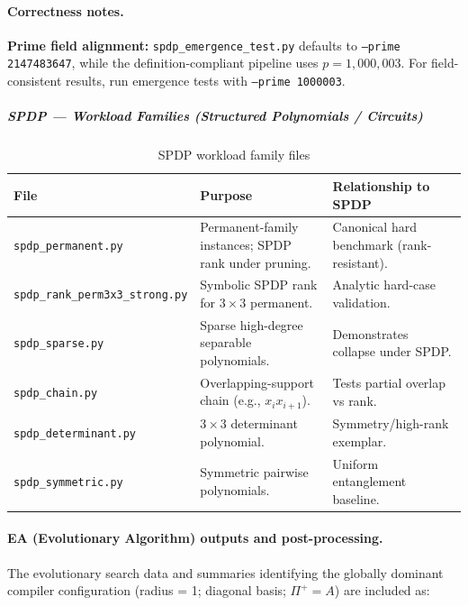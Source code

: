 \documentclass[12pt]{article}
\theoremstyle{definition}
\theoremstyle{definition}
\theoremstyle{remark}
\theoremstyle{remark}
\begin{document}
\paragraph{Correctness notes.}
\textbf{Prime field alignment:} \texttt{spdp\_emergence\_test.py} defaults to \texttt{--prime 2147483647}, while the definition-compliant pipeline uses $p = 1{,}000{,}003$. For field-consistent results, run emergence tests with \texttt{--prime 1000003}.

\subparagraph{SPDP --- Workload Families (Structured Polynomials / Circuits)}
\begin{table}[h]
\centering
\footnotesize
\begin{tabular}{p{3.8cm}p{5.2cm}p{5cm}}
\toprule
\textbf{File} & \textbf{Purpose} & \textbf{Relationship to SPDP} \\
\midrule
\texttt{spdp\_permanent.py} & Permanent-family instances; SPDP rank under pruning. & Canonical hard benchmark (rank-resistant). \\
\addlinespace
\texttt{spdp\_rank\_perm3x3\_\linebreak strong.py} & Symbolic SPDP rank for $3\times 3$ permanent. & Analytic hard-case validation. \\
\addlinespace
\texttt{spdp\_sparse.py} & Sparse high-degree separable polynomials. & Demonstrates collapse under SPDP. \\
\addlinespace
\texttt{spdp\_chain.py} & Overlapping-support chain (e.g., $x_i x_{i+1}$). & Tests partial overlap vs rank. \\
\addlinespace
\texttt{spdp\_determinant.py} & $3\times 3$ determinant polynomial. & Symmetry/high-rank exemplar. \\
\addlinespace
\texttt{spdp\_symmetric.py} & Symmetric pairwise polynomials. & Uniform entanglement baseline. \\
\bottomrule
\end{tabular}
\caption{SPDP workload family files}
\label{tab:spdp-workloads}
\end{table}

\paragraph{EA (Evolutionary Algorithm) outputs and post-processing.}
The evolutionary search data and summaries identifying the globally dominant compiler configuration (radius = 1; diagonal basis; $\Pi^+ = A$) are included as:
\end{document}
